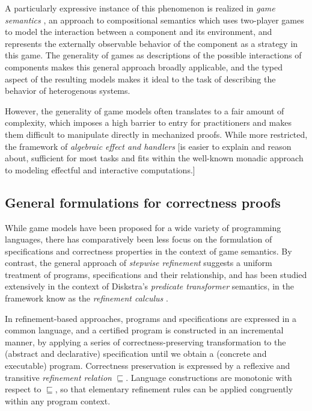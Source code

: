 \documentclass[format=sigplan,authordraft]{acmart}
\begin{document}
A particularly expressive instance of this phenomenon
is realized in \emph{game semantics} \cite{cspgs},
an approach to compositional semantics
which uses two-player games to model
the interaction between a component and its environment,
and represents the externally observable behavior
of the component as a strategy in this game.
The generality of games as
descriptions of the possible interactions of components
makes this general approach broadly applicable,
and the typed aspect of the resulting models
makes it ideal to the task of
describing the behavior of heterogenous systems.

However,
the generality of game models
often translates to a fair amount of complexity,
which imposes a high barrier to entry for practitioners
and makes them difficult to manipulate directly
in mechanized proofs.
While more restricted,
the framework of \emph{algebraic effect and handlers} \cite{eff}
[is easier to explain and reason about, sufficient for most tasks
and fits within the well-known monadic approach
to modeling effectful and interactive computations.]

\subsection{General formulations for correctness proofs}

While game models have been proposed
for a wide variety of programming languages,
there has comparatively been less focus
on the formulation of specifications and correctness properties
in the context of game semantics.
By contrast,
the general approach of \emph{stepwise refinement}
suggests a uniform treatment of programs, specifications
and their relationship,
and has been studied extensively in the context of
Diskstra's \emph{predicate transformer} semantics,
in the framework know as the \emph{refinement calculus} \cite{refcal}.

In refinement-based approaches,
programs and specifications are expressed in a common language,
and a certified program is constructed in an incremental manner,
by applying a series of correctness-preserving transformation
to the (abstract and declarative) specification
until we obtain a (concrete and executable) program.
Correctness preservation is expressed
by a reflexive and transitive \emph{refinement relation} $\sqsubseteq$.
Language constructions are monotonic with respect to $\sqsubseteq$,
so that elementary refinement rules
can be applied congruently within any program context.
\end{document}
